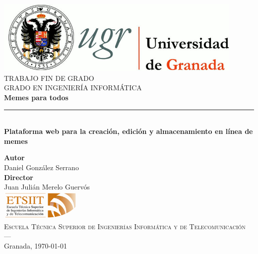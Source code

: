\begin{titlepage}
\newlength{\centeroffset}
\setlength{\centeroffset}{-0.5\oddsidemargin}
\addtolength{\centeroffset}{0.5\evensidemargin}
\thispagestyle{empty}

\noindent\hspace*{\centeroffset}\begin{minipage}{\textwidth}

\centering
\includegraphics[width=0.9\textwidth]{logos/logo_ugr.jpg}\\[1.4cm]

\textsc{ \Large TRABAJO FIN DE GRADO}\\[0.4 cm]
\textsc{ GRADO EN INGENIERÍA INFORMÁTICA}\\[1 cm]

{\Huge\bfseries Memes para todos \\}
\noindent\rule[-1ex]{\textwidth}{3 pt}\\[3.5 ex]
{\large\bfseries Plataforma web para la creación, edición y almacenamiento en línea de memes }
\end{minipage}

\vspace{2.5cm}
\noindent\hspace*{\centeroffset}
\begin{minipage}{\textwidth}
\centering

\textbf{Autor}\\ {Daniel González Serrano}\\[2.5 ex]
\textbf{Director}\\ {Juan Julián Merelo Guervós}\\[2 cm]
\includegraphics[width=0.3\textwidth]{logos/etsiit_logo.png}\\[0.1 cm]
\textsc{Escuela Técnica Superior de Ingenierías Informática y de Telecomunicación}\\
\textsc{---}\\
Granada, \today

\end{minipage}
\end{titlepage}
